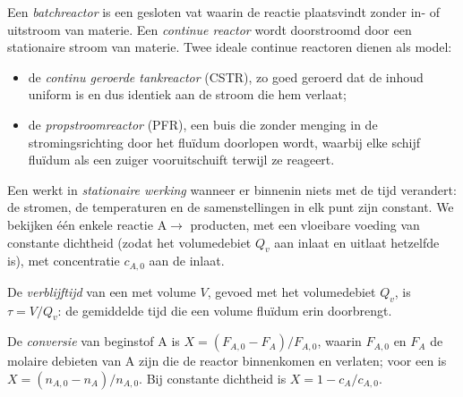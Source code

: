 \begin{definition}[Reactortypen]\label{def:b2:continuous-reactors:reactors}
Een \emph{batchreactor} is een gesloten vat waarin de
reactie plaatsvindt zonder in- of uitstroom van materie. Een
\emph{continue reactor} wordt doorstroomd door een stationaire
stroom van materie. Twee ideale continue reactoren dienen als model:
\begin{itemize}
  \item de \emph{continu geroerde tankreactor}
(CSTR), zo goed geroerd dat de inhoud
        uniform is en dus identiek aan de stroom die hem verlaat;
  \item de \emph{propstroomreactor} (PFR), een buis
        die zonder menging in de stromingsrichting door het fluïdum doorlopen wordt, waarbij elke schijf
        fluïdum als een zuiger vooruitschuift terwijl ze reageert.
\end{itemize}
\end{definition}

Een  werkt in \emph{stationaire werking} wanneer
er binnenin niets met de tijd verandert: de stromen, de temperaturen en de
samenstellingen in elk punt zijn constant. We bekijken één enkele reactie
$\mathrm A \to$ producten, met een vloeibare voeding van constante dichtheid (zodat het
volumedebiet $Q_v$ aan inlaat en uitlaat hetzelfde is), met
concentratie $c_{A,0}$ aan de inlaat.

\begin{definition}[Verblijftijd]\label{def:b2:continuous-reactors:residence-time}
De \emph{verblijftijd} van een  met
volume $V$, gevoed met het volumedebiet $Q_v$, is $\tau = V/Q_v$: de gemiddelde
tijd die een volume fluïdum erin doorbrengt.
\end{definition}

\begin{definition}[Conversie]\label{def:b2:continuous-reactors:conversion}
De \emph{conversie} van beginstof A is $X = (F_{A,0} -
F_A)/F_{A,0}$, waarin $F_{A,0}$ en $F_A$ de molaire debieten van A zijn die de
reactor binnenkomen en verlaten; voor een  is $X = (n_{A,0} -
n_A)/n_{A,0}$. Bij constante dichtheid is $X = 1 - c_A/c_{A,0}$.
\end{definition}

